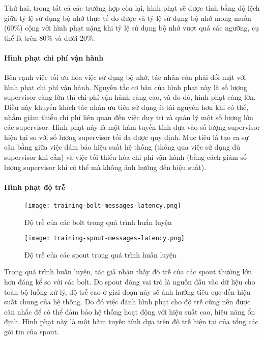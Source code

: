 Thứ hai, trong tất cả các trường hợp còn lại, hình phạt sẽ được tính bằng độ lệch giữa tỷ lệ sử dụng bộ nhớ thực tế đo được và tỷ lệ sử dụng bộ nhớ mong muốn (60\%) cộng với hình phạt nặng khi tỷ lệ sử dụng bộ nhớ vượt quá các ngưỡng, cụ thể là trên 80\% và dưới 20\%.

\paragraph{Hình phạt chi phí vận hành}

Bên cạnh việc tối ưu hóa việc sử dụng bộ nhớ, tác nhân còn phải đối mặt với hình phạt chi phí vận hành. Nguyên tắc cơ bản của hình phạt này là số lượng supervisor càng lớn thì chi phí vận hành càng cao, và do đó, hình phạt càng lớn. Điều này khuyến khích tác nhân ưu tiên sử dụng ít tài nguyên hơn khi có thể, nhằm giảm thiểu chi phí liên quan đến việc duy trì và quản lý một số lượng lớn các supervisor. Hình phạt này là một hàm tuyến tính dựa vào số lượng supervisor hiện tại so với số lượng supervisor tối đa được quy định. Mục tiêu là tạo ra sự cân bằng giữa việc đảm bảo hiệu suất hệ thống (thông qua việc sử dụng đủ supervisor khi cần) và việc tối thiểu hóa chi phí vận hành (bằng cách giảm số lượng supervisor khi có thể mà không ảnh hưởng đến hiệu suất).

\paragraph{Hình phạt độ trễ}

\begin{figure}
    \begin{minipage}{0.48 \textwidth}
        \texttt{[image: training-bolt-messages-latency.png]}
        \caption{Độ trễ của các bolt trong quá trình huấn luyện}
    \end{minipage}
    \begin{minipage}{0.48 \textwidth}
        \texttt{[image: training-spout-messages-latency.png]}
        \caption{Độ trễ của các spout trong quá trình huấn luyện}
    \end{minipage}
\end{figure}

Trong quá trình huấn luyện, tác giả nhận thấy độ trễ của các spout thường lớn hơn đáng kể so với các bolt. Do spout đóng vai trò là nguồn đầu vào dữ liệu cho toàn bộ luồng xử lý, độ trễ cao ở giai đoạn này sẽ ảnh hưởng tiêu cực đến hiệu suất chung của hệ thống. Do đó việc đánh hình phạt cho độ trễ cũng nên được cân nhắc để có thể đảm bảo hệ thống hoạt động với hiệu suất cao, hiệu năng ổn định. Hình phạt này là một hàm tuyến tính dựa trên độ trễ hiện tại của tổng các gói tin của spout.

